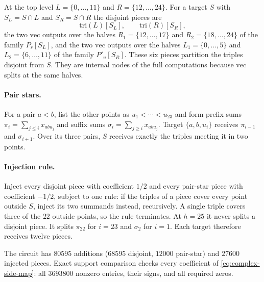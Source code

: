 At the top level $L=\{0,\ldots,11\}$ and $R=\{12,\ldots,24\}$. For a target
$S$ with $S_L=S\cap L$ and $S_R=S\cap R$ the disjoint pieces are
\[
 \mathrm{tri}(L)[S_L],\qquad \mathrm{tri}(R)[S_R],
\]
the two $\mathrm{vec}$ outputs over the halves $R_1=\{12,\ldots,17\}$ and
$R_2=\{18,\ldots,24\}$ of the family $P_r[S_L]$, and the two $\mathrm{vec}$
outputs over the halves $L_1=\{0,\ldots,5\}$ and $L_2=\{6,\ldots,11\}$ of
the family $P'_u[S_R]$. These six pieces partition the triples disjoint from
$S$. They are internal nodes of the full computations because
$\mathrm{vec}$ splits at the same halves.

\paragraph{Pair stars.}
For a pair $a<b$, list the other points as $u_1<\cdots<u_{23}$ and form
prefix sums $\pi_i=\sum_{j\le i}x_{abu_j}$ and suffix sums
$\sigma_i=\sum_{j\ge i}x_{abu_j}$. Target $\{a,b,u_i\}$ receives
$\pi_{i-1}$ and $\sigma_{i+1}$. Over its three pairs, $S$ receives exactly the
triples meeting it in two points.

\paragraph{Injection rule.}
Inject every disjoint piece with coefficient $1/2$ and every pair-star piece
with coefficient $-1/2$, subject to one rule: if the triples of a piece cover
every point outside $S$, inject its two summands instead, recursively. A single
triple covers three of the $22$ outside points, so the rule terminates. At
$h=25$ it never splits a disjoint piece. It splits $\pi_{22}$ for $i=23$ and
$\sigma_2$ for $i=1$. Each target therefore receives twelve pieces.

The circuit has $80595$ additions ($68595$ disjoint, $12000$ pair-star) and
$27600$ injected pieces. Exact support comparison checks every coefficient
of \eqref{eq:complex-side-map}: all $3693800$ nonzero entries, their signs,
and all required zeros.

